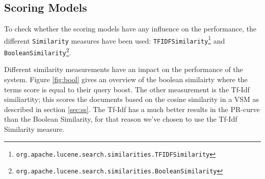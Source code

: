 \documentclass[11pt]{article}
\begin{document}
\subsection{Scoring Models}\label{sec:scmodels}
To check whether the scoring models have any influence on the performance, the different \texttt{Similarity} measures have been used: \texttt{TFIDFSimilarity}\footnote{\texttt{org.apache.lucene.search.similarities.TFIDFSimilarity}} and \texttt{BooleanSimilarity}\footnote{\texttt{org.apache.lucene.search.similarities.BooleanSimilarity}}. 

Different similarity measurements have an impact on the performance of the system. Figure \ref{fig:bool} gives an overview of the boolean similairty where the terms score is equal to their query boost. The other measurement is the Tf-Idf similiartity; this scores the documents based on the cosine similarity in a VSM as described in section \ref{sec:ss}. The Tf-Idf has a much better results in the PR-curve than the Boolean Similarity, for that reason we've chosen to use the Tf-Idf Similarity measure.
\end{document}
